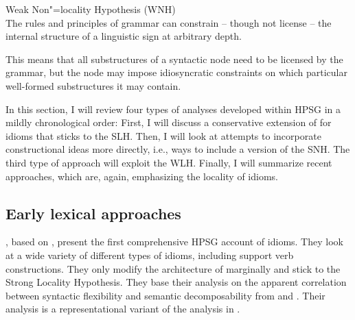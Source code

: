 \documentclass[output=paper
	        ,collection
	        ,collectionchapter
 	        ,biblatex
                ,babelshorthands
                ,newtxmath
                ,draftmode
                ,colorlinks, citecolor=brown
]{langscibook}
\begin{document}
\ea Weak Non"=locality Hypothesis (WNH)\label{wnh}\\
The rules and principles of grammar can constrain -- though not license -- the internal structure of a linguistic sign at arbitrary depth.
\z 

This means that all substructures of a syntactic node need to be licensed by the grammar, but the node may impose idiosyncratic constraints on which particular well-formed substructures it may contain.




\bigskip%
In this section, I will review four types of analyses developed within HPSG in a mildly chronological order:
First, I will discuss a conservative extension of \citet{ps2} for idioms \citep{KE94a} that sticks to the SLH. 
Then, I will look at attempts to incorporate constructional ideas more directly, i.e., ways to include a version of the SNH. 
The third type of approach will exploit the WLH. Finally, I will summarize recent approaches, which are, again, emphasizing the locality of idioms.




\subsection{Early lexical approaches}
\label{Sec-EarlyLexical}



\citet{KE94a}, based on \citet{Erbach92a}, present the first comprehensive HPSG account of idioms. 
They look at a wide variety of different types of  idioms, including support verb constructions. 
They only modify the architecture of \citet{ps2} marginally and stick to the Strong Locality Hypothesis. 
They base their analysis on the apparent correlation between syntactic flexibility and semantic decomposability from \citet{WSN84a-u} and \citet{NSW94a}. 
Their analysis is a representational variant of the analysis in \citet{GKPS85a}.
\end{document}

